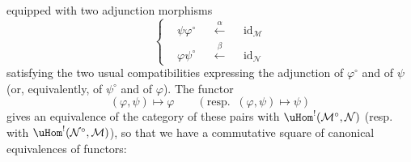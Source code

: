 equipped with two adjunction morphisms
\[
\left\{
\begin{aligned}
&\psi\varphi^\circ &&\xleftarrow{\alpha} &&\mathrm{id}_{\mathcal{M}}\\
&\varphi\psi^\circ &&\xleftarrow{\beta} &&\mathrm{id}_{\mathcal{N}}
\end{aligned}
\right.
\tag*{(4.1.15)}
\]
satisfying the two usual compatibilities expressing the adjunction of $\varphi^\circ$ and of $\psi$ (or, equivalently, of $\psi^\circ$ and of $\varphi$). The functor
\[
(\varphi,\psi) \longmapsto \varphi \qquad (\text{resp.}\;\; (\varphi,\psi) \longmapsto \psi)
\]
gives an equivalence of the category of these pairs with $\uHom^!(\mathcal{M}^\circ,\mathcal{N})$ (resp. with $\uHom^!(\mathcal{N}^\circ,\mathcal{M})$), so that we have a commutative square of canonical equivalences of functors: